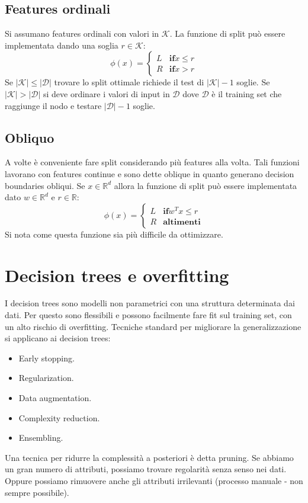 	\subsection{Features ordinali}
	Si assumano features ordinali con valori in $\mathcal{K}$.
	La funzione di split pu\`o essere implementata dando una soglia $r\in\mathcal{K}$:
	$$\phi(x) = \begin{cases}L &\mathbf{if} x\le r\\
		R &\mathbf{if} x>r
	\end{cases}$$
	Se $|\mathcal{K}|\le|\mathcal{D}|$ trovare lo split ottimale richiede il test di $|\mathcal{K}|-1$ soglie.
	Se $|\mathcal{K}|>|\mathcal{D}|$ si deve ordinare i valori di input in $\mathcal{D}$ dove $\mathcal{D}$ \`e il training set che raggiunge il nodo e testare $|\mathcal{D}|-1$ soglie.
	
	\subsection{Obliquo}
	A volte \`e conveniente fare split considerando pi\`u features alla volta.
	Tali funzioni lavorano con features continue e sono dette oblique in quanto generano decision boundaries obliqui.
	Se $x\in\mathbb{R}^d$ allora la funzione di split pu\`o essere implementata dato $w\in\mathbb{R}^d$ e $r\in\mathbb{R}$:
	$$\phi(x) = \begin{cases}L &\mathbf{if} w^Tx\le r\\
		R &\mathbf{altimenti}
	\end{cases}$$
	Si nota come questa funzione sia pi\`u difficile da ottimizzare.
	
	\section{Decision trees e overfitting}
	I decision trees sono modelli non parametrici con una struttura determinata dai dati.
	Per questo sono flessibili e possono facilmente fare fit sul training set, con un alto rischio di overfitting.
	Tecniche standard per migliorare la generalizzazione si applicano ai decision trees:
	\begin{multicols}{2}
		\begin{itemize}
			\item Early stopping.
			\item Regularization.
			\item Data augmentation.
			\item Complexity reduction.
			\item Ensembling.
		\end{itemize}
	\end{multicols}
	Una tecnica per ridurre la complessit\`a a posteriori \`e detta pruning.
	Se abbiamo un gran numero di attributi, possiamo trovare regolarità senza senso nei dati. 
	Oppure possiamo rimuovere anche gli attributi irrilevanti (processo manuale - non sempre possibile).

